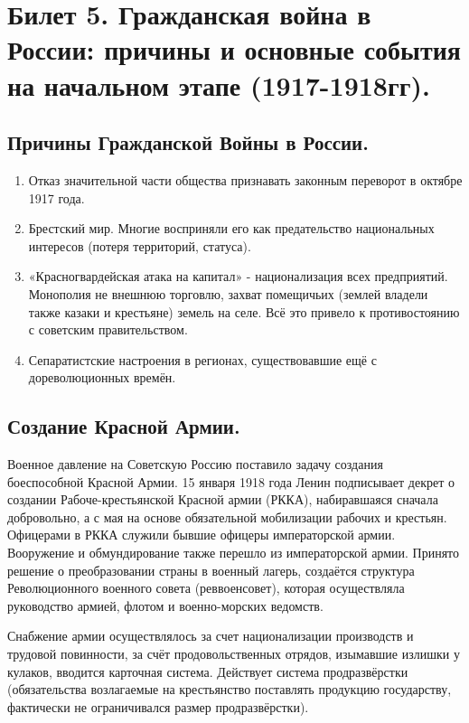 \section{Билет 5. Гражданская война в России: причины и основные события на начальном этапе (1917-1918гг).}

\subsection{Причины Гражданской Войны в России.}
\begin{enumerate}
	\item Отказ значительной части общества признавать законным переворот в октябре 1917 года.\\
	\item Брестский мир. Многие восприняли его как предательство национальных интересов (потеря территорий, статуса). \\
	\item «Красногвардейская атака на капитал» - национализация всех предприятий. Монополия не внешнюю торговлю, захват помещичьих (землей владели также казаки и крестьяне) земель на селе. Всё это привело к противостоянию с советским правительством. \\
	\item Сепаратистские настроения в регионах, существовавшие ещё с дореволюционных времён.
\end{enumerate}




\subsection{Создание Красной Армии.}
Военное давление на Советскую Россию поставило задачу создания боеспособной Красной Армии. 15 января 1918 года Ленин подписывает декрет о создании Рабоче-крестьянской Красной армии (РККА), набиравшаяся сначала добровольно, а с мая на основе обязательной мобилизации рабочих и крестьян. Офицерами в РККА служили бывшие офицеры императорской армии. Вооружение и обмундирование также перешло из императорской армии. 
Принято решение о преобразовании страны в военный лагерь, создаётся структура Революционного военного совета (реввоенсовет), которая осуществляла руководство армией, флотом и военно-морских ведомств.

Снабжение армии осуществлялось за счет национализации производств и трудовой повинности, за счёт продовольственных отрядов, изымавшие излишки у кулаков, вводится карточная система. Действует система продразвёрстки (обязательства возлагаемые на крестьянство поставлять продукцию государству, фактически не ограничивался размер продразвёрстки).

